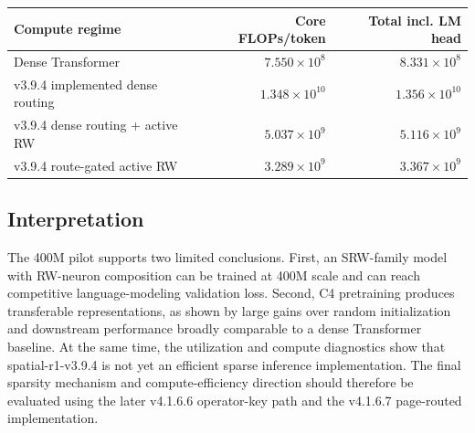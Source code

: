 \documentclass{article}
\begin{document}
\begin{center}
\small
\setlength{\tabcolsep}{8pt}
\renewcommand{\arraystretch}{1.10}
\begin{tabular}{lrr}
\toprule
Compute regime & Core FLOPs/token & Total incl. LM head \\
\midrule
Dense Transformer & $7.550\times 10^8$ & $8.331\times 10^8$ \\
v3.9.4 implemented dense routing & $1.348\times 10^{10}$ & $1.356\times 10^{10}$ \\
v3.9.4 dense routing + active RW & $5.037\times 10^9$ & $5.116\times 10^9$ \\
v3.9.4 route-gated active RW & $3.289\times 10^9$ & $3.367\times 10^9$ \\
\bottomrule
\end{tabular}
\label{tab:app_compute}
\end{center}

\subsection{Interpretation}

The 400M pilot supports two limited conclusions. First, an SRW-family model with RW-neuron composition can be trained at 400M scale and can reach competitive language-modeling validation loss. Second, C4 pretraining produces transferable representations, as shown by large gains over random initialization and downstream performance broadly comparable to a dense Transformer baseline. At the same time, the utilization and compute diagnostics show that spatial-r1-v3.9.4 is not yet an efficient sparse inference implementation. The final sparsity mechanism and compute-efficiency direction should therefore be evaluated using the later v4.1.6.6 operator-key path and the v4.1.6.7 page-routed implementation.
\end{document}

